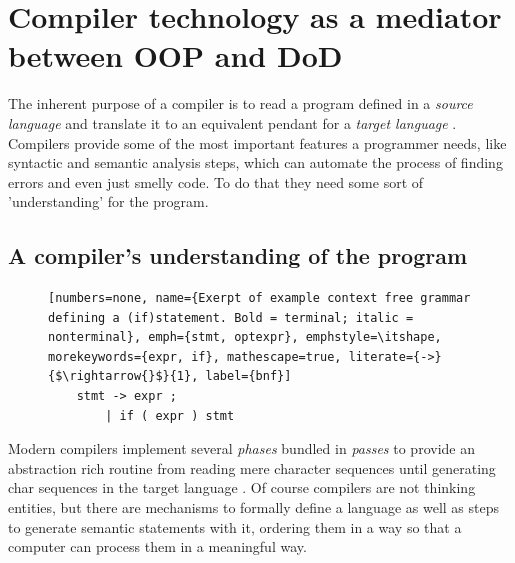 \chapter{Compiler technology as a mediator between OOP and DoD}
The inherent purpose of a compiler is to read a program defined in a \textit{source language} and translate it to an equivalent pendant for a \textit{target language} .\\
Compilers provide some of the most important features a programmer needs, like syntactic and semantic analysis steps, which can automate the process of finding errors and even just smelly code. To do that they need some sort of 'understanding' for the program.

\section{A compiler's understanding of the program}\label{compilers_understanding}
\begin{figure}
\vspace{-0.8cm}
	\begin{lstlisting}[numbers=none, name={Exerpt of example context free grammar defining a (if)statement. Bold = terminal; italic = nonterminal}, emph={stmt, optexpr}, emphstyle=\itshape, morekeywords={expr, if}, mathescape=true, literate={->}{$\rightarrow{}$}{1}, label={bnf}]
	stmt -> expr ;
		| if ( expr ) stmt
	\end{lstlisting}
\end{figure}
Modern compilers implement several \textit{phases} bundled in \textit{passes} to provide an abstraction rich routine from reading mere character sequences until generating char sequences in the target language . Of course compilers are not thinking entities, but there are mechanisms to formally define a language as well as steps to generate semantic statements with it, ordering them in a way so that a computer can process them in a meaningful way.
